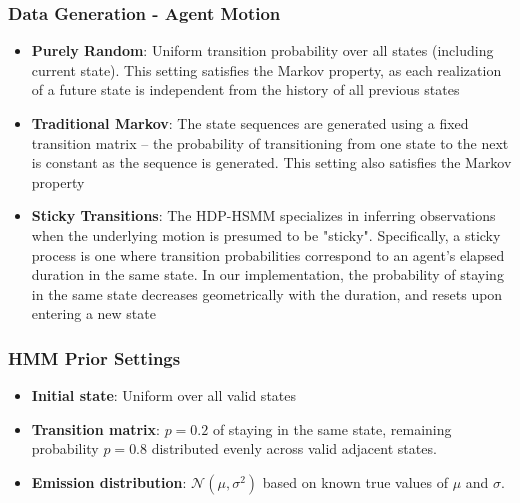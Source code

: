 \documentclass{beamer}
\begin{document}
\begin{frame}
    \frametitle{Data Generation - Agent Motion}
    \begin{itemize}
    \item \textbf{Purely Random}: Uniform transition probability over all states (including current state). This setting satisfies the Markov property, as each realization of a future state is independent from the history of all previous states
    \item \textbf{Traditional Markov}: The state sequences are generated using a fixed transition matrix -- the probability of transitioning from one state to the next is constant as the sequence is generated. This setting also satisfies the Markov property
    \item \textbf{Sticky Transitions}: The HDP-HSMM specializes in inferring observations when the underlying motion is presumed to be "sticky". Specifically, a sticky process is one where transition probabilities correspond to an agent's elapsed duration in the same state. In our implementation, the probability of staying in the same state decreases geometrically with the duration, and resets upon entering a new state
    \end{itemize}
\end{frame}

\begin{frame}
	\frametitle{HMM Prior Settings}
	\begin{itemize}
		\item \textbf{Initial state}: Uniform over all valid states
		\item \textbf{Transition matrix}: $p = 0.2$ of staying in the same state, remaining probability $p = 0.8$ distributed evenly across valid adjacent states.
		\item \textbf{Emission distribution}: $\mathcal{N}(\mu, \sigma^2)$ based on known true values of $\mu$ and $\sigma$.
	\end{itemize}
\end{frame}
\end{document}
